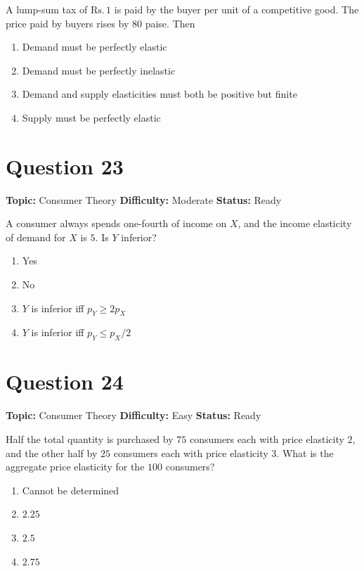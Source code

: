 \documentclass[11pt]{article}
\begin{document}
A lump-sum tax of $\mathrm{Rs.}\,1$ is paid by the buyer per unit of a competitive good.
The price paid by buyers rises by $80$ paise. Then
\begin{enumerate}[label=(\Alph*)]
\item Demand must be perfectly elastic
\item Demand must be perfectly inelastic
\item Demand and supply elasticities must both be positive but finite
\item Supply must be perfectly elastic
\end{enumerate}

\newpage

\section*{Question 23}


\noindent\textbf{Topic:} Consumer Theory \quad \textbf{Difficulty:} Moderate \quad \textbf{Status:} Ready



A consumer always spends one-fourth of income on $X$, and the income elasticity of demand for $X$ is $5$. Is $Y$ inferior?
\begin{enumerate}[label=(\Alph*)]
\item Yes \item No
\item $Y$ is inferior iff $p_Y \ge 2 p_X$
\item $Y$ is inferior iff $p_Y \le p_X/2$
\end{enumerate}

\newpage

\section*{Question 24}


\noindent\textbf{Topic:} Consumer Theory \quad \textbf{Difficulty:} Easy \quad \textbf{Status:} Ready



Half the total quantity is purchased by $75$ consumers each with price elasticity
$2$, and the other half by $25$ consumers each with price elasticity $3$. What is
the aggregate price elasticity for the $100$ consumers?
\begin{enumerate}[label=(\Alph*)]
\item Cannot be determined \item $2.25$ \item $2.5$ \item $2.75$
\end{enumerate}
\end{document}
